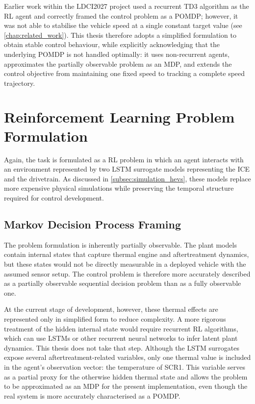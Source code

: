 Earlier work within the \ac{LDCI2027} project used a recurrent \ac{TD3} algorithm as the \ac{RL} agent and correctly framed the control problem as a \ac{POMDP}; however, it was not able to stabilise the vehicle speed at a single constant target value (see \autoref{chap:related_work}). This thesis therefore adopts a simplified formulation to obtain stable control behaviour, while explicitly acknowledging that the underlying \ac{POMDP} is not handled optimally: it uses non-recurrent agents, approximates the partially observable problem as an \ac{MDP}, and extends the control objective from maintaining one fixed speed to tracking a complete speed trajectory.

\section{Reinforcement Learning Problem Formulation}
\label{sec:method_rl_formulation}
Again, the task is formulated as a \ac{RL} problem in which an agent interacts with an environment represented by two \ac{LSTM} surrogate models representing the \ac{ICE} and the drivetrain. As discussed in \autoref{subsec:simulation_hevs}, these models replace more expensive physical simulations while preserving the temporal structure required for control development.

\subsection{Markov Decision Process Framing}
\label{subsec:method_mdp}
The problem formulation is inherently partially observable. The plant models contain internal states that capture thermal engine and aftertreatment dynamics, but these states would not be directly measurable in a deployed vehicle with the assumed sensor setup. The control problem is therefore more accurately described as a partially observable sequential decision problem than as a fully observable one.

At the current stage of development, however, these thermal effects are represented only in simplified form to reduce complexity. A more rigorous treatment of the hidden internal state would require recurrent \ac{RL} algorithms, which can use \ac{LSTM}s or other recurrent neural networks to infer latent plant dynamics. This thesis does not take that step. Although the \ac{LSTM} surrogates expose several aftertreatment-related variables, only one thermal value is included in the agent's observation vector: the temperature of \ac{SCR}1. This variable serves as a partial proxy for the otherwise hidden thermal state and allows the problem to be approximated as an \ac{MDP} for the present implementation, even though the real system is more accurately characterised as a \ac{POMDP}.

